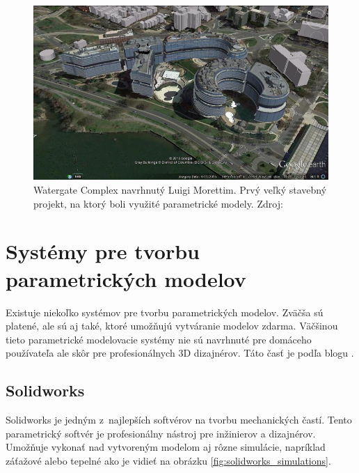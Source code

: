 \begin{figure}[H]
    \centering
    \includegraphics[width = \linewidth]{obrazky-figures/watergate-complex.jpg}
    \caption{Watergate Complex navrhnutý Luigi Morettim. Prvý veľký stavebný projekt, na ktorý boli využité parametrické modely. Zdroj: \cite{munger_2015}}
    \label{fig:Watergate}
\end{figure}





\section{Systémy pre tvorbu parametrických modelov} \label{sec:Existing_systems}
Existuje niekoľko systémov pre tvorbu parametrických modelov. Zväčša sú platené, ale sú aj také, ktoré umožňujú vytváranie modelov zdarma. Väčšinou tieto parametrické modelovacie systémy nie sú navrhnuté pre domáceho používateľa ale skôr pre profesionálnych 3D dizajnérov. Táto časť je podľa blogu \cite{gaget_2018}.


\subsection*{Solidworks}
Solidworks je jedným z~najlepších softvérov na tvorbu mechanických častí. Tento parametrický softvér je profesionálny nástroj pre inžinierov a dizajnérov. Umožňuje vykonať nad vytvoreným modelom aj rôzne simulácie, napríklad záťažové alebo tepelné ako je vidieť na obrázku \ref{fig:solidworks_simulations}.



